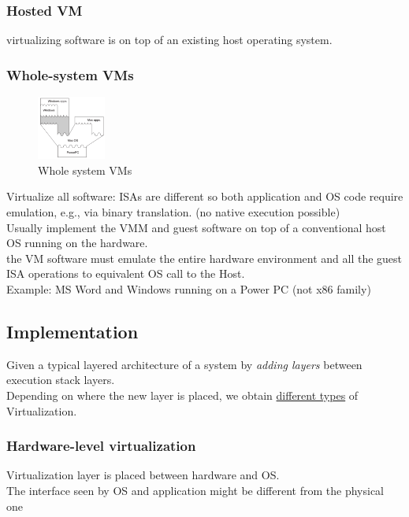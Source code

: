 \documentclass[10pt, oneside]{article}
\begin{document}
\subsubsection*{Hosted VM}
virtualizing software is on top of an existing host operating system.

\subsubsection*{Whole-system VMs}
\begin{multicols}{2}
    \begin{figure}[H]
        \begin{center}
        \includegraphics[width=0.2\textwidth]{img/img37.png}
        \caption{Whole system VMs}
        \label{fig:diff ISA}
        \end{center}
    \end{figure}
    \columnbreak
    Virtualize all software: ISAs are different so both application and OS code require emulation, e.g., via binary translation. (no native execution possible)\\Usually implement the VMM and guest software on top of a conventional host OS running on the hardware.\\the VM software must emulate the entire hardware environment and all the guest ISA operations to equivalent OS call to the Host.\\Example: MS Word and Windows running on a Power PC (not x86 family)
\end{multicols}

\subsection{Implementation}
Given a typical layered architecture of a system by {\sl adding layers} between execution stack layers.\\
Depending on where the new layer is placed, we obtain \underline{different types} of Virtualization.
\subsubsection{Hardware-level virtualization}Virtualization layer is placed between hardware and OS.\\The interface seen by OS and application might be different from the physical one
\end{document}
